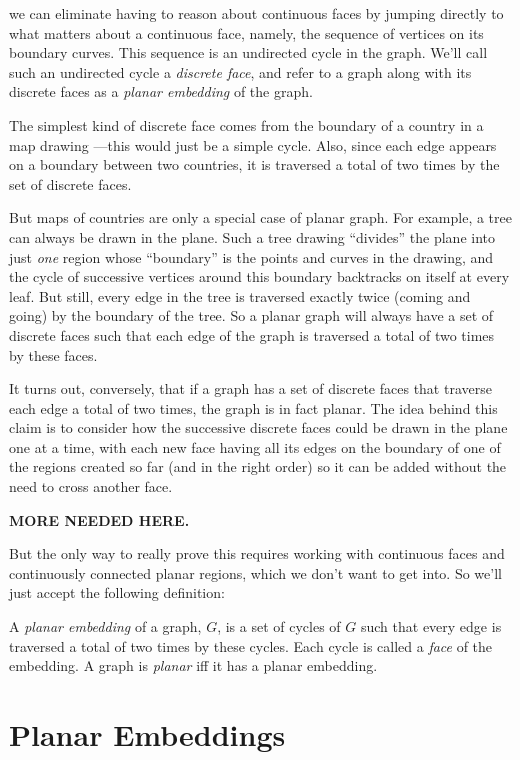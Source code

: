 we can eliminate having to reason about continuous faces by jumping
directly to what matters about a continuous face, namely, the sequence of
vertices on its boundary curves.  This sequence is an undirected cycle in
the graph.  We'll call such an undirected cycle a \emph{discrete face},
and refer to a graph along with its discrete faces as a \emph{planar
embedding} of the graph.

The simplest kind of discrete face comes from the boundary of a country in
a map drawing ---this would just be a simple cycle.  Also, since each edge
appears on a boundary between two countries, it is traversed a total of
two times by the set of discrete faces.

But maps of countries are only a special case of planar graph.  For
example, a tree can always be drawn in the plane.  Such a tree drawing
``divides'' the plane into just \emph{one} region whose ``boundary'' is
the points and curves in the drawing, and the cycle of successive vertices
around this boundary backtracks on itself at every leaf.  But still, every
edge in the tree is traversed exactly twice (coming and going) by the
boundary of the tree.  So a planar graph will always have a set of
discrete faces such that each edge of the graph is traversed a total of
two times by these faces.

It turns out, conversely, that if a graph has a set of discrete faces that
traverse each edge a total of two times, the graph is in fact planar.  The
idea behind this claim is to consider how the successive discrete faces
could be drawn in the plane one at a time, with each new face having all
its edges on the boundary of one of the regions created so far (and in the
right order) so it can be added without the need to cross another face.

\textbf{MORE NEEDED HERE.}

But the only way to really prove this requires working with continuous
faces and continuously connected planar regions, which we don't want to
get into.  So we'll just accept the following definition:

\begin{definition}
A \emph{planar embedding} of a graph, $G$, is a set of cycles of $G$ such
that every edge is traversed a total of two times by these cycles.  Each
cycle is called a \emph{face} of the embedding.  A graph is \emph{planar}
iff it has a planar embedding.
\end{definition}
\fi

\section{Planar Embeddings}

